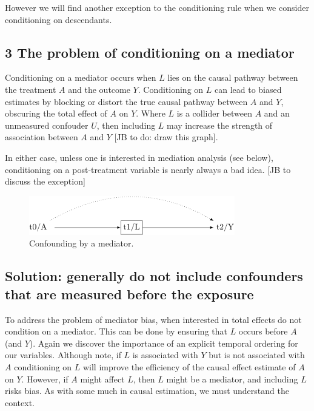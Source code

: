 \documentclass[
  singlecolumn]{report}
\begin{document}
However we will find another exception to the conditioning rule when we
consider conditioning on descendants.

\hypertarget{the-problem-of-conditioning-on-a-mediator}{%
\subsection{3 The problem of conditioning on a
mediator}\label{the-problem-of-conditioning-on-a-mediator}}

Conditioning on a mediator occurs when \(L\) lies on the causal pathway
between the treatment \(A\) and the outcome \(Y\). Conditioning on \(L\)
can lead to biased estimates by blocking or distort the true causal
pathway between \(A\) and \(Y\), obscuring the total effect of \(A\) on
\(Y\). Where \(L\) is a collider between \(A\) and an unmeasured
confouder \(U\), then including \(L\) may increase the strength of
association between \(A\) and \(Y\) {[}JB to do: draw this graph{]}.

In either case, unless one is interested in mediation analysis (see
below), conditioning on a post-treatment variable is nearly always a bad
idea. {[}JB to discuss the exception{]}

\begin{figure}

{\centering \includegraphics[width=0.8\textwidth,height=\textheight]{causal-dags_files/figure-pdf/fig-dag-mediator-1.pdf}

}

\caption{\label{fig-dag-mediator}Confounding by a mediator.}

\end{figure}

\hypertarget{solution-generally-do-not-include-confounders-that-are-measured-before-the-exposure}{%
\subsection{Solution: generally do not include confounders that are
measured before the
exposure}\label{solution-generally-do-not-include-confounders-that-are-measured-before-the-exposure}}

To address the problem of mediator bias, when interested in total
effects do not condition on a mediator. This can be done by ensuring
that \(L\) occurs before \(A\) (and \(Y\)). Again we discover the
importance of an explicit temporal ordering for our variables. Although
note, if \(L\) is associated with \(Y\) but is not associated with \(A\)
conditioning on \(L\) will improve the efficiency of the causal effect
estimate of \(A\) on \(Y\). However, if \(A\) might affect \(L\), then
\(L\) might be a mediator, and including \(L\) risks bias. As with some
much in causal estimation, we must understand the context.
\end{document}
